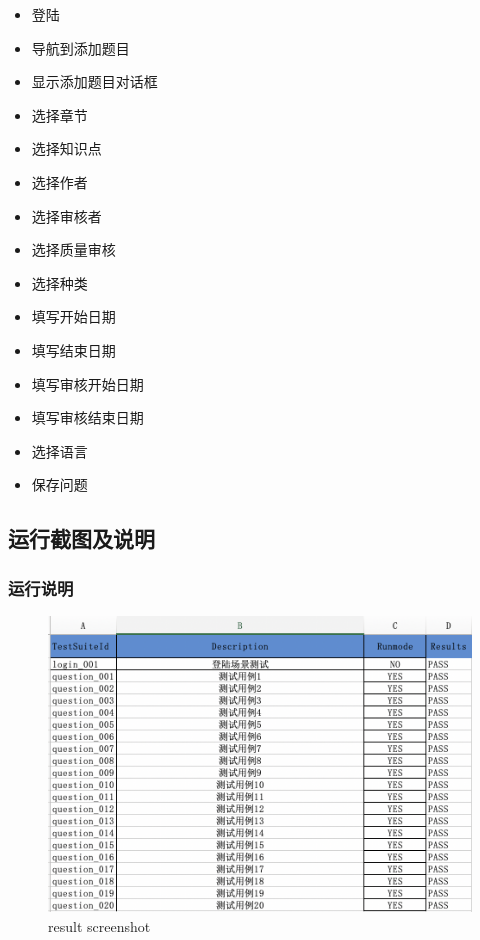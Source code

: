 \documentclass[hyperref, a4paper]{ctexart}
\providecommand{\tightlist}{%
  \setlength{\itemsep}{0pt}\setlength{\parskip}{0pt}}
\begin{document}
\begin{itemize}
\tightlist
\item
  登陆
\item
  导航到添加题目
\item
  显示添加题目对话框
\item
  选择章节
\item
  选择知识点
\item
  选择作者
\item
  选择审核者
\item
  选择质量审核
\item
  选择种类
\item
  填写开始日期
\item
  填写结束日期
\item
  填写审核开始日期
\item
  填写审核结束日期
\item
  选择语言
\item
  保存问题
\end{itemize}

\hypertarget{ux8fd0ux884cux622aux56feux53caux8bf4ux660e}{%
\subsection{运行截图及说明}\label{ux8fd0ux884cux622aux56feux53caux8bf4ux660e}}

\hypertarget{ux8fd0ux884cux8bf4ux660e}{%
\subsubsection{运行说明}\label{ux8fd0ux884cux8bf4ux660e}}

\begin{figure}
  \centering
  \includegraphics[scale=0.7]{./screenshots/result.jpg}
  \caption{result screenshot}\label{4}
\end{figure}
\end{document}
